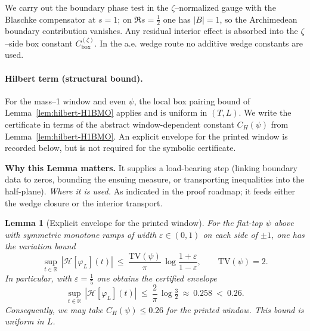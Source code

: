 \documentclass[11pt]{article}
\newtheorem{lemma}{Lemma}[section]
\theoremstyle{definition}
\theoremstyle{remark}
\newcommand{\R}{\mathbb{R}}
\begin{document}
We carry out the boundary phase test in the $\zeta$–normalized gauge with the Blaschke compensator at $s=1$; on $\Re s=\tfrac12$ one has $|B|=1$, so the Archimedean boundary contribution vanishes. Any residual interior effect is absorbed into the $\zeta$–side box constant $C_{\mathrm{box}}^{(\zeta)}$. In the a.e. wedge route no additive wedge constants are used.








\vspace{1.0cm}
\paragraph{Hilbert term (structural bound).}
For the mass--1 window and even \(\psi\), the local box pairing bound of Lemma~\ref{lem:hilbert-H1BMO} applies and is uniform in \((T,L)\). We write the certificate in terms of the abstract window-dependent constant \(C_H(\psi)\) from Lemma~\ref{lem:hilbert-H1BMO}. An explicit envelope for the printed window is recorded below, but is not required for the symbolic certificate.




\vspace{1.0cm}
\noindent\textbf{Why this Lemma matters.} It supplies a load-bearing step (linking boundary data to zeros, bounding the ensuing measure, or transporting inequalities into the half-plane).
\noindent\textit{Where it is used.} As indicated in the proof roadmap; it feeds either the wedge closure or the interior transport.
\begin{lemma}[Explicit envelope for the printed window]
\label{lem:CH-explicit}
For the flat-top \(\psi\) above with symmetric monotone ramps of width \(\varepsilon\in(0,1)\) on each side of \(\pm1\), one has the variation bound
\[
  \sup_{t\in\R}\,|\mathcal H[\varphi_L](t)|\ \le\ \frac{\mathrm{TV}(\psi)}{\pi}\,\log\frac{1+\varepsilon}{1-\varepsilon},\qquad \mathrm{TV}(\psi)=2.
\]
In particular, with \(\varepsilon=\tfrac15\) one obtains the certified envelope
\[
  \sup_{t\in\R}\,|\mathcal H[\varphi_L](t)|\ \le\ \frac{2}{\pi}\,\log\tfrac{3}{2}\ \approx\ 0.258\ <\ 0.26.
\]
Consequently, we may take \(C_H(\psi)\le 0.26\) for the printed window. This bound is uniform in \(L\).
\end{lemma}
\end{document}
